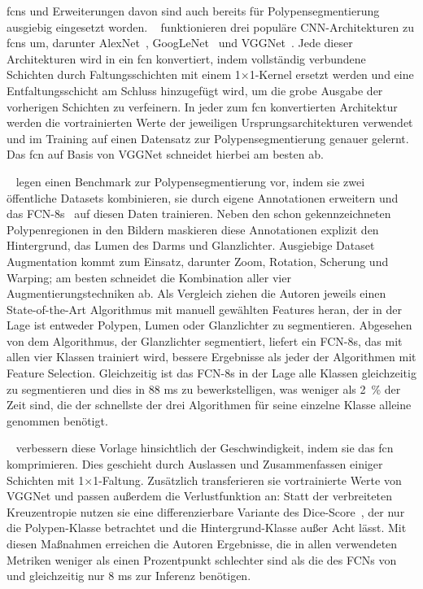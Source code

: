 \glspl{fcn} und Erweiterungen davon sind auch bereits für Polypensegmentierung ausgiebig eingesetzt worden.
\citeauthor{Brandao.2017}~\cite{Brandao.2017} funktionieren drei populäre CNN-Architekturen zu \glspl{fcn} um, darunter AlexNet~\cite{Krizhevsky.2012}, GoogLeNet~\cite{Szegedy.2015} und VGGNet~\cite{Simonyan.2014}.
Jede dieser Architekturen wird in ein \gls{fcn} konvertiert, indem vollständig verbundene Schichten durch Faltungsschichten mit einem 1$\times$1-Kernel ersetzt werden und eine Entfaltungsschicht am Schluss hinzugefügt wird, um die grobe Ausgabe der vorherigen Schichten zu verfeinern.
In jeder zum \gls{fcn} konvertierten Architektur werden die vortrainierten Werte der jeweiligen Ursprungsarchitekturen verwendet und im Training auf einen Datensatz zur Polypensegmentierung genauer gelernt.
Das \gls{fcn} auf Basis von VGGNet schneidet hierbei am besten ab.

\citeauthor{Vazquez.2017}~\cite{Vazquez.2017} legen einen Benchmark zur Polypensegmentierung vor, indem sie zwei öffentliche Datasets kombinieren, sie durch eigene Annotationen erweitern und das FCN-8s~\cite{Long.2015} auf diesen Daten trainieren.
Neben den schon gekennzeichneten Polypenregionen in den Bildern maskieren diese Annotationen explizit den Hintergrund, das Lumen des Darms und Glanzlichter.
Ausgiebige Dataset Augmentation kommt zum Einsatz, darunter Zoom, Rotation, Scherung und Warping; am besten schneidet die Kombination aller vier Augmentierungstechniken ab.
Als Vergleich ziehen die Autoren jeweils einen State-of-the-Art Algorithmus mit manuell gewählten Features heran, der in der Lage ist entweder Polypen, Lumen oder Glanzlichter zu segmentieren.
Abgesehen von dem Algorithmus, der Glanzlichter segmentiert, liefert ein FCN-8s, das mit allen vier Klassen trainiert wird, bessere Ergebnisse als jeder der Algorithmen mit Feature Selection.
Gleichzeitig ist das FCN-8s in der Lage alle Klassen gleichzeitig zu segmentieren und dies in 88 ms zu bewerkstelligen, was weniger als 2~\% der Zeit sind, die der schnellste der drei Algorithmen für seine einzelne Klasse alleine genommen benötigt.

\citeauthor{Wichakam.2018}~\cite{Wichakam.2018} verbessern diese Vorlage hinsichtlich der Geschwindigkeit, indem sie das \gls{fcn} komprimieren.
Dies geschieht durch Auslassen und Zusammenfassen einiger Schichten mit 1$\times$1-Faltung.
Zusätzlich transferieren sie vortrainierte Werte von VGGNet und passen außerdem die Verlustfunktion an:
Statt der verbreiteten Kreuzentropie nutzen sie eine differenzierbare Variante des Dice-Score~\cite{Srensen.1948}, der nur die Polypen-Klasse betrachtet und die Hintergrund-Klasse außer Acht lässt.
Mit diesen Maßnahmen erreichen die Autoren Ergebnisse, die in allen verwendeten Metriken weniger als einen Prozentpunkt schlechter sind als die des FCNs von \citeauthor{Vazquez.2017} und gleichzeitig nur 8 ms zur Inferenz benötigen.

